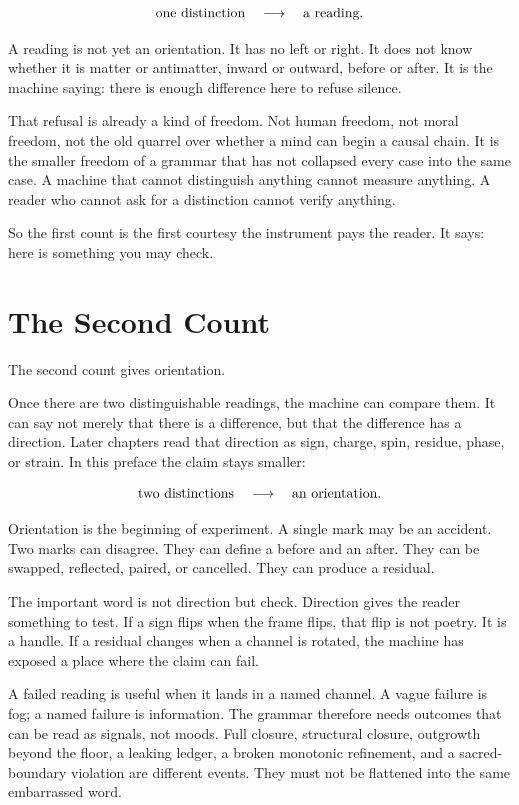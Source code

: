 \[
\hbox{one distinction}\quad\longrightarrow\quad\hbox{a reading}.
\]

A reading is not yet an orientation. It has no left or right. It does
not know whether it is matter or antimatter, inward or outward, before
or after. It is the machine saying: there is enough difference here to
refuse silence.

That refusal is already a kind of freedom. Not human freedom, not moral
freedom, not the old quarrel over whether a mind can begin a causal
chain. It is the smaller freedom of a grammar that has not collapsed
every case into the same case. A machine that cannot distinguish
anything cannot measure anything. A reader who cannot ask for a
distinction cannot verify anything.

So the first count is the first courtesy the instrument pays the reader.
It says: here is something you may check.

\section*{The Second Count}

The second count gives orientation.

Once there are two distinguishable readings, the machine can compare
them. It can say not merely that there is a difference, but that the
difference has a direction. Later chapters read that direction as sign,
charge, spin, residue, phase, or strain. In this preface the claim stays
smaller:

\[
\hbox{two distinctions}\quad\longrightarrow\quad\hbox{an orientation}.
\]

Orientation is the beginning of experiment. A single mark may be an
accident. Two marks can disagree. They can define a before and an after.
They can be swapped, reflected, paired, or cancelled. They can produce a
residual.

The important word is not direction but check. Direction gives the
reader something to test. If a sign flips when the frame flips, that
flip is not poetry. It is a handle. If a residual changes when a channel
is rotated, the machine has exposed a place where the claim can fail.

A failed reading is useful when it lands in a named channel. A vague
failure is fog; a named failure is information. The grammar therefore
needs outcomes that can be read as signals, not moods. Full closure,
structural closure, outgrowth beyond the floor, a leaking ledger, a
broken monotonic refinement, and a sacred-boundary violation are
different events. They must not be flattened into the same embarrassed
word.


